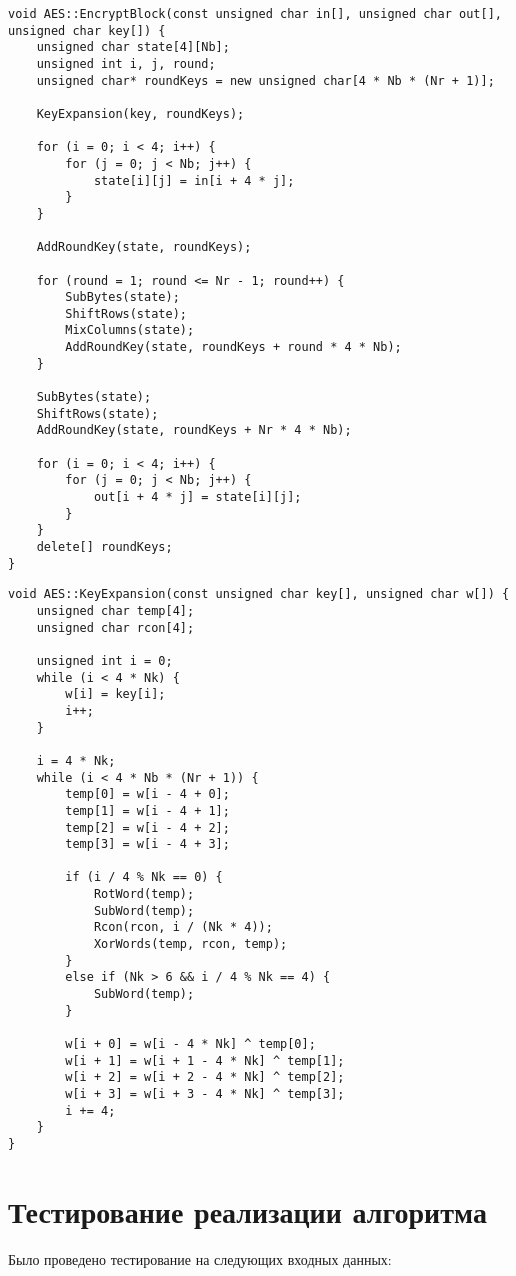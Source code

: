 \begin{lstlisting}[label=code:reflector,caption=Функция шифратора]
void AES::EncryptBlock(const unsigned char in[], unsigned char out[],
unsigned char key[]) {
	unsigned char state[4][Nb];
	unsigned int i, j, round;
	unsigned char* roundKeys = new unsigned char[4 * Nb * (Nr + 1)];
	
	KeyExpansion(key, roundKeys);
	
	for (i = 0; i < 4; i++) {
		for (j = 0; j < Nb; j++) {
			state[i][j] = in[i + 4 * j];
		}
	}
	
	AddRoundKey(state, roundKeys);
	
	for (round = 1; round <= Nr - 1; round++) {
		SubBytes(state);
		ShiftRows(state);
		MixColumns(state);
		AddRoundKey(state, roundKeys + round * 4 * Nb);
	}
	
	SubBytes(state);
	ShiftRows(state);
	AddRoundKey(state, roundKeys + Nr * 4 * Nb);
	
	for (i = 0; i < 4; i++) {
		for (j = 0; j < Nb; j++) {
			out[i + 4 * j] = state[i][j];
		}
	}
	delete[] roundKeys;
}
\end{lstlisting}

\begin{lstlisting}[label=code:enigma,caption=Функция расширения ключей]
void AES::KeyExpansion(const unsigned char key[], unsigned char w[]) {
	unsigned char temp[4];
	unsigned char rcon[4];
	
	unsigned int i = 0;
	while (i < 4 * Nk) {
		w[i] = key[i];
		i++;
	}
	
	i = 4 * Nk;
	while (i < 4 * Nb * (Nr + 1)) {
		temp[0] = w[i - 4 + 0];
		temp[1] = w[i - 4 + 1];
		temp[2] = w[i - 4 + 2];
		temp[3] = w[i - 4 + 3];
		
		if (i / 4 % Nk == 0) {
			RotWord(temp);
			SubWord(temp);
			Rcon(rcon, i / (Nk * 4));
			XorWords(temp, rcon, temp);
		}
		else if (Nk > 6 && i / 4 % Nk == 4) {
			SubWord(temp);
		}
		
		w[i + 0] = w[i - 4 * Nk] ^ temp[0];
		w[i + 1] = w[i + 1 - 4 * Nk] ^ temp[1];
		w[i + 2] = w[i + 2 - 4 * Nk] ^ temp[2];
		w[i + 3] = w[i + 3 - 4 * Nk] ^ temp[3];
		i += 4;
	}
}
\end{lstlisting}

\section{Тестирование реализации алгоритма}

Было проведено тестирование на следующих входных данных:

